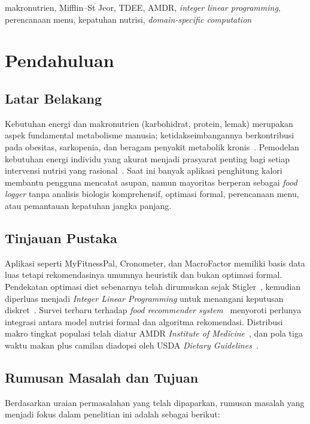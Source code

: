 \documentclass[conference]{IEEEtran}
\begin{document}
\begin{IEEEkeywords}
makronutrien, Mifflin--St Jeor, TDEE, AMDR, \textit{integer linear programming}, perencanaan menu, kepatuhan nutrisi, \textit{domain-specific computation}
\end{IEEEkeywords}

\section{Pendahuluan}

\subsection{Latar Belakang}
Kebutuhan energi dan makronutrien (karbohidrat, protein, lemak) merupakan aspek fundamental metabolisme manusia; ketidakseimbangannya berkontribusi pada obesitas, sarkopenia, dan beragam penyakit metabolik kronis~\cite{hall2011quantification}. Pemodelan kebutuhan energi individu yang akurat menjadi prasyarat penting bagi setiap intervensi nutrisi yang rasional~\cite{frankenfield2005comparison}. Saat ini banyak aplikasi penghitung kalori membantu pengguna mencatat asupan, namun mayoritas berperan sebagai \textit{food logger} tanpa analisis biologis komprehensif, optimasi formal, perencanaan menu, atau pemantauan kepatuhan jangka panjang.

\subsection{Tinjauan Pustaka}
Aplikasi seperti MyFitnessPal, Cronometer, dan MacroFactor memiliki basis data luas tetapi rekomendasinya umumnya heuristik dan bukan optimasi formal. Pendekatan optimasi diet sebenarnya telah dirumuskan sejak Stigler~\cite{stigler1945cost}, kemudian diperluas menjadi \textit{Integer Linear Programming} untuk menangani keputusan diskret~\cite{wolsey1998integer}. Survei terbaru terhadap \textit{food recommender system}~\cite{tran2018overview} menyoroti perlunya integrasi antara model nutrisi formal dan algoritma rekomendasi. Distribusi makro tingkat populasi telah diatur AMDR \textit{Institute of Medicine}~\cite{iom2005}, dan pola tiga waktu makan plus camilan diadopsi oleh USDA \textit{Dietary Guidelines}~\cite{usda_dgaa}.

\subsection{Rumusan Masalah dan Tujuan}
Berdasarkan uraian permasalahan yang telah dipaparkan, rumusan masalah yang menjadi fokus dalam penelitian ini adalah sebagai berikut:
\end{document}
